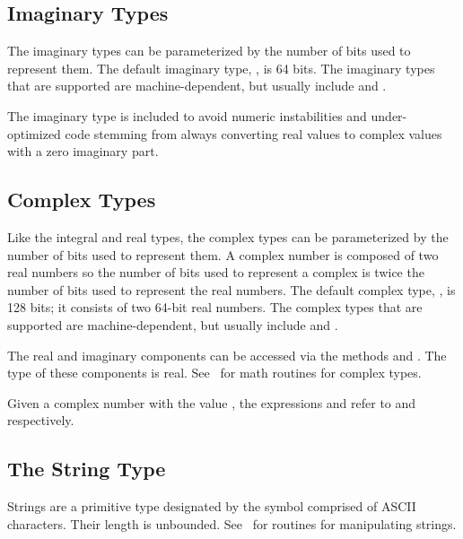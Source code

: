 \subsection{Imaginary Types}
\label{Imaginary_Types}

The imaginary types can be parameterized by the number of bits used to
represent them.  The default imaginary type, , is 64 bits.
The imaginary types that are supported are machine-dependent, but
usually include  and .

\begin{rationale}
The imaginary type is included to avoid numeric instabilities and
under-optimized code stemming from always converting real values to
complex values with a zero imaginary part.
\end{rationale}

\subsection{Complex Types}
\label{Complex_Types}

Like the integral and real types, the complex types can be
parameterized by the number of bits used to represent them.  A complex
number is composed of two real numbers so the number of bits used to
represent a complex is twice the number of bits used to represent the
real numbers.  The default complex type, , is 128 bits;
it consists of two 64-bit real numbers.  The complex types that are
supported are machine-dependent, but usually
include  and .

The real and imaginary components can be accessed via the methods
 and .  The type of these components is real.
See~ for math routines for complex types.

\begin{example}
Given a complex number  with the value , the
expressions  and  refer to 
and  respectively.
\end{example}

\subsection{The String Type}
\label{The_String_Type}

Strings are a primitive type designated by the symbol 
comprised of ASCII characters.  Their length is unbounded.
See~ for routines for manipulating strings.


